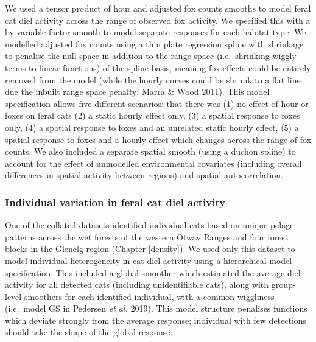 \documentclass[11pt,a4paper,titlepage,twoside,openright]{style/unimelbthesis}
\begin{document}
\begin{mainmatter}
We used a tensor product of hour and adjusted fox counts smooths to model feral cat diel activity across the range of observed fox activity. We specified this with a by variable factor smooth to model separate responses for each habitat type. We modelled adjusted fox counts using a thin plate regression spline with shrinkage to penalise the null space in addition to the range space (i.e.~shrinking wiggly terms to linear functions) of the spline basis, meaning fox effects could be entirely removed from the model (while the hourly curves could be shrunk to a flat line due the inbuilt range space penalty; Marra \& Wood 2011). This model specification allows five different scenarios: that there was (1) no effect of hour or foxes on feral cats (2) a static hourly effect only, (3) a spatial response to foxes only, (4) a spatial response to foxes and an unrelated static hourly effect, (5) a spatial response to foxes and a hourly effect which changes across the range of fox counts. We also included a separate spatial smooth (using a duchon spline) to account for the effect of unmodelled environmental covariates (including overall differences in spatial activity between regions) and spatial autocorrelation.

\hypertarget{individual-variation-in-feral-cat-diel-activity}{%
\subsubsection{Individual variation in feral cat diel activity}\label{individual-variation-in-feral-cat-diel-activity}}

One of the collated datasets identified individual cats based on unique pelage patterns across the wet forests of the western Otway Ranges and four forest blocks in the Glenelg region (Chapter \ref{density}). We used only this dataset to model individual heterogeneity in cat diel activity using a hierarchical model specification. This included a global smoother which estimated the average diel activity for all detected cats (including unidentifiable cats), along with group-level smoothers for each identified individual, with a common wiggliness (i.e.~model GS in Pedersen \emph{et al.} 2019). This model structure penalises functions which deviate strongly from the average response; individual with few detections should take the shape of the global response.

\newpage
\begin{figure}


\end{figure}
\end{mainmatter}
\end{document}
